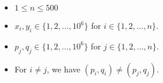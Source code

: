 \begin{itemize}
	\tightlist
	\item $1 \le n \le 500$
	\item $x_i,y_i\in\{1,2,\dots,10^6\}$ for $i\in \{1,2,\dots,n\}$.
	\item $p_j,q_j\in\{1,2,\dots,10^6\}$ for $j\in \{1,2,\dots,n\}$.
    \item For $i\neq j$, we have $(p_i,q_i)\neq (p_j,q_j)$.
\end{itemize}

